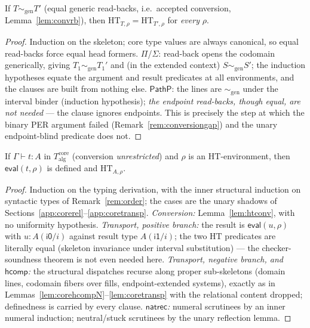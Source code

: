 \documentclass{lmcs}
\newcommand{\hcomp}{\mathsf{hcomp}}
\newcommand{\ii}{\mathsf{i1}}
\newcommand{\io}{\mathsf{i0}}
\newcommand{\evalop}{\mathsf{eval}}
\begin{document}
\begin{lem}\label{lem:htconv}
  If $T \sim_{\mathrm{gen}} T'$ (equal generic read-backs, i.e.\
  accepted conversion, Lemma~\ref{lem:convrb}), then
  $\mathrm{HT}_{T,\rho} = \mathrm{HT}_{T',\rho}$ for \emph{every}
  $\rho$.
\end{lem}
\begin{proof}
  Induction on the skeleton; core type values are always canonical,
  so equal read-backs force equal head formers.  $\Pi$/$\Sigma$:
  read-back opens the codomain generically, giving
  $T_1 \sim_{\mathrm{gen}} T_1'$ and (in the extended context)
  $S \sim_{\mathrm{gen}} S'$; the induction hypotheses equate the
  argument and result predicates at all environments, and the
  clauses are built from nothing else.  $\mathsf{PathP}$: the lines
  are $\sim_{\mathrm{gen}}$ under the interval binder (induction
  hypothesis); \emph{the endpoint read-backs, though equal, are not
  needed} --- the clause ignores endpoints.  This is precisely the
  step at which the binary PER argument failed
  (Remark~\ref{rem:conversiongap}) and the unary endpoint-blind
  predicate does not.
\end{proof}

\begin{thm}\label{thm:htfund}
  If $\Gamma \vdash t : A$ in $T^{\mathrm{core}}_{\mathrm{alg}}$
  (conversion \emph{unrestricted}) and $\rho$ is an
  $\mathrm{HT}$-environment, then $\evalop(t,\rho)$ is defined and
  $\mathrm{HT}_{A,\rho}$.
\end{thm}
\begin{proof}
  Induction on the typing derivation, with the inner structural
  induction on syntactic types of Remark~\ref{rem:order}; the cases
  are the unary shadows of
  Sections~\ref{app:corerel}--\ref{app:coretransp}.
  \emph{Conversion:} Lemma~\ref{lem:htconv}, with no uniformity
  hypothesis.  \emph{Transport, positive branch:} the result is
  $\evalop(u,\rho)$ with $u : A(\io/i)$ against result type
  $A(\ii/i)$; the two $\mathrm{HT}$ predicates are literally equal
  (skeleton invariance under interval substitution) --- the
  checker-soundness theorem is not even needed here.
  \emph{Transport, negative branch, and $\hcomp$:} the structural
  dispatches recurse along proper sub-skeletons (domain lines,
  codomain fibers over fills, endpoint-extended systems), exactly
  as in Lemmas~\ref{lem:corehcompN}--\ref{lem:coretransp} with the
  relational content dropped; definedness is carried by every
  clause.  \emph{$\mathsf{natrec}$:} numeral scrutinees by an inner
  numeral induction; neutral/stuck scrutinees by the unary
  reflection lemma.
\end{proof}
\end{document}
